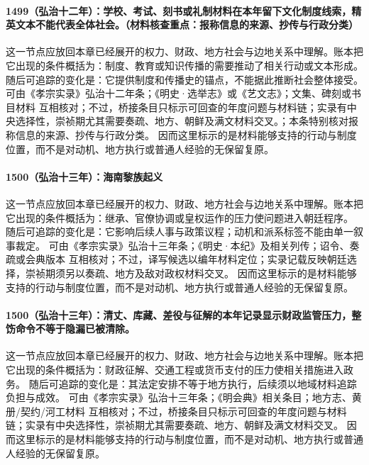 \paragraph{1499（弘治十二年）：学校、考试、刻书或礼制材料在本年留下文化制度线索，精英文本不能代表全体社会。（材料核查重点：报称信息的来源、抄传与行政分类）} 这一节点应放回本章已经展开的权力、财政、地方社会与边地关系中理解。账本把它出现的条件概括为：制度、教育或知识传播的需要推动了相关行动或文本形成。 随后可追踪的变化是：它提供制度和传播史的锚点，不能据此推断社会整体接受。 可由《孝宗实录》弘治十二年条；《明史·选举志》或《艺文志》；文集、碑刻或书目材料 互相核对；不过，桥接条目只标示可回查的年度问题与材料链；实录有中央选择性，崇祯期尤其需要奏疏、地方、朝鲜及满文材料交叉。；本条特别核对报称信息的来源、抄传与行政分类。 因而这里标示的是材料能够支持的行动与制度位置，而不是对动机、地方执行或普通人经验的无保留复原。

\paragraph{1500（弘治十三年）：海南黎族起义} 这一节点应放回本章已经展开的权力、财政、地方社会与边地关系中理解。账本把它出现的条件概括为：继承、官僚协调或皇权运作的压力使问题进入朝廷程序。 随后可追踪的变化是：它影响后续人事与政策议程；动机和派系标签不能由单一叙事裁定。 可由《孝宗实录》弘治十三年条；《明史·本纪》及相关列传；诏令、奏疏或会典版本 互相核对；不过，译写候选以编年材料定位；实录记载反映朝廷选择，崇祯期须另以奏疏、地方及敌对政权材料交叉。 因而这里标示的是材料能够支持的行动与制度位置，而不是对动机、地方执行或普通人经验的无保留复原。

\paragraph{1500（弘治十三年）：清丈、库藏、差役与征解的本年记录显示财政监管压力，整饬命令不等于隐漏已被清除。} 这一节点应放回本章已经展开的权力、财政、地方社会与边地关系中理解。账本把它出现的条件概括为：财政征解、交通工程或货币支付的压力使相关措施进入政务。 随后可追踪的变化是：其法定安排不等于地方执行，后续须以地域材料追踪负担与成效。 可由《孝宗实录》弘治十三年条；《明会典》相关条目；地方志、黄册/契约/河工材料 互相核对；不过，桥接条目只标示可回查的年度问题与材料链；实录有中央选择性，崇祯期尤其需要奏疏、地方、朝鲜及满文材料交叉。 因而这里标示的是材料能够支持的行动与制度位置，而不是对动机、地方执行或普通人经验的无保留复原。

